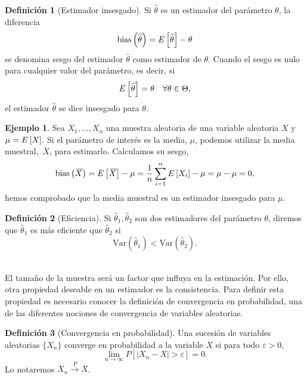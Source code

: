 \documentclass[12pt,a4paper]{report} %
\let\mathbb\relax
\newcommand{\bias}{\text{bias}}
\newcommand{\Var}{\text{Var}}
\newcommand{\olsi}[1]{\,\overline{\!{#1}}} %
\theoremstyle{definition}
\newtheorem{definition}{Definición}[section]
\newtheorem{example}[theorem]{Ejemplo}
\begin{document}
\begin{definition}[Estimador insesgado]
  Si $\widehat{\theta}$ es un estimador del parámetro $\theta$, la diferencia \[
\bias\left( \widehat{\theta}\right) = \mathbb{E}\left [\widehat{\theta} \right ] - \theta
\]
se denomina sesgo del estimador $\widehat{\theta}$ como estimador de $\theta$. Cuando el sesgo es nulo para cualquier valor del parámetro, es decir, si\[
\mathbb{E} \left [\widehat{\theta}\right] = \theta\quad \forall\theta \in\Theta,
\]
el estimador $\widehat{\theta}$ se dice insesgado para $\theta$.\\
\end{definition}

\begin{example}\label{ej:medest}
  Sea $X_1,\dots,X_n$ una muestra aleatoria de una variable aleatoria $X$ y $\mu = \E\left[X\right]$. Si el parámetro de interés es la media, $\mu$, podemos utilizar la media muestral, $\olsi{X}$, para estimarlo. Calculamos su sesgo,\[
\bias\left(\olsi{X} \right) = \E\left[ \olsi{X}\right] - \mu = \frac{1}{n} \sum_{i=1}^n\E \left [ X_i\right] - \mu = \mu - \mu = 0,
\]
hemos comprobado que la media muestral es un estimador insesgado para $\mu$.\\
\end{example}

\begin{definition}[Eficiencia]
  Si $\hat{\theta}_1, \hat{\theta}_2$ son dos estimadores del parámetro $\theta$, diremos que $\hat{\theta}_1$ es más eficiente que $\hat{\theta}_2$ si \[
\Var\left(\hat{\theta}_1\right) < \Var\left(\hat{\theta}_2\right).
  \]\\[-10pt]
\end{definition}

El tamaño de la muestra será un factor que influya en la estimación. Por ello, otra propiedad deseable en un estimador es la consistencia. Para definir esta propiedad es necesario conocer la definición de convergencia en probabilidad, una de las diferentes nociones de convergencia de variables aleatorias.\\

\begin{definition}[Convergencia en probabilidad]
  Una sucesión de variables aleatorias $\{X_n\}$ converge en probabilidad a la variable $X$ si para todo $\varepsilon > 0$,\[
\lim_{n\to\infty}P\left[|X_n-X|>\varepsilon \right] = 0. 
  \] Lo notaremos $X_n\xrightarrow[]{P}X$.\\
\end{definition}
\end{document}
